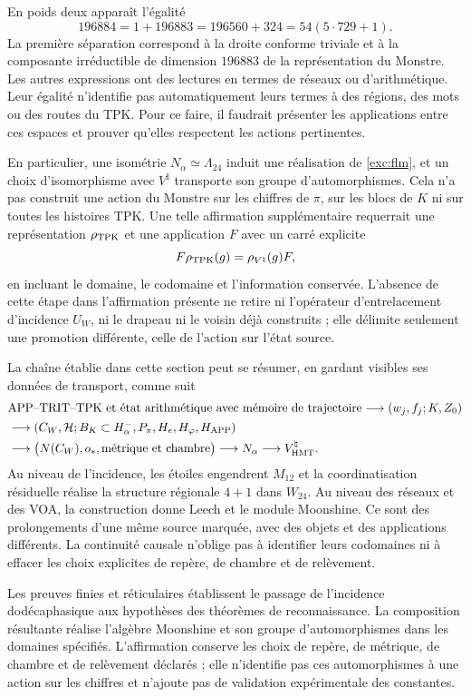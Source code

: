 En poids deux apparaît l'égalité
\[
 196884=1+196883=196560+324=54(5\cdot729+1).
\]
La première séparation correspond à la droite conforme triviale et à la
composante irréductible de dimension $196883$ de la représentation
du Monstre. Les autres expressions ont des lectures en termes de réseaux ou
d'arithmétique. Leur égalité n'identifie pas automatiquement leurs termes
à des régions, des mots ou des routes du TPK. Pour ce faire, il faudrait
présenter les applications entre ces espaces et prouver qu'elles respectent les
actions pertinentes.

En particulier, une isométrie $N_\alpha\simeq\Lambda_{24}$ induit
une réalisation de \eqref{exc:flm}, et un choix d'isomorphisme
avec $V^\natural$ transporte son groupe d'automorphismes. Cela n'a pas
construit une action du Monstre sur les chiffres de
$\pi$, sur les blocs de $K$ ni sur toutes les histoires TPK.
Une telle affirmation supplémentaire requerrait une représentation
$\rho_{\rm TPK}$ et une application $F$ avec un carré explicite
\[
 F\rho_{\rm TPK}(g)=\rho_{V^\natural}(g)F,
\]
en incluant le domaine, le codomaine et l'information conservée. L'absence
de cette étape dans l'affirmation présente ne retire ni l'opérateur d'entrelacement
d'incidence $U_W$, ni le drapeau ni le voisin déjà construits ; elle
délimite seulement une promotion différente, celle de l'action sur l'état source.

La chaîne établie dans cette section peut se résumer, en gardant visibles ses données de transport, comme suit
\begin{align*}
 &\text{APP--TRIT--TPK et état arithmétique avec mémoire de trajectoire}
   \longrightarrow (w_j,f_j;K,Z_0)\\
 &\longrightarrow (C_W,\mathcal H;B_K\subset H^-_\alpha,
                   P_\pi,H_e,H_\varphi,H_{\rm APP})\\
 &\longrightarrow \bigl(N(C_W),o_*,\text{métrique et chambre}\bigr)
   \longrightarrow N_\alpha
   \longrightarrow V^\natural_{\rm HMT}.
\end{align*}
Au niveau de l'incidence, les étoiles engendrent $M_{12}$ et la
coordinatisation résiduelle réalise la structure régionale $4+1$ dans $W_{24}$.
Au niveau des réseaux et des VOA, la construction donne Leech et le module
Moonshine. Ce sont des prolongements d'une même source marquée, avec
des objets et des applications différents. La continuité causale n'oblige pas à
identifier leurs codomaines ni à effacer les choix explicites
de repère, de chambre et de relèvement.

Les preuves finies et réticulaires établissent le passage de
l’incidence dodécaphasique aux hypothèses des théorèmes de
reconnaissance. La composition résultante réalise l’algèbre Moonshine
et son groupe d’automorphismes dans les domaines spécifiés.
L’affirmation conserve les choix de repère, de métrique, de chambre et de
relèvement déclarés ; elle n’identifie pas ces automorphismes à une
action sur les chiffres et n’ajoute pas de validation expérimentale des
constantes.
